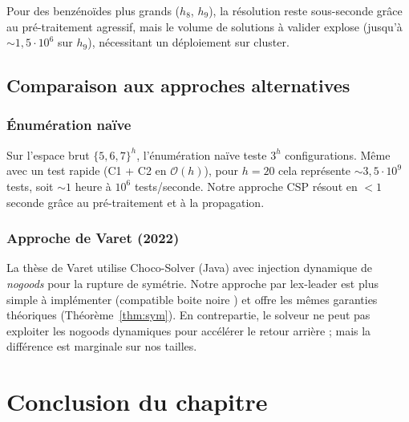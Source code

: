 \documentclass[12pt,a4paper]{article}
\theoremstyle{definition}
\theoremstyle{remark}
\newcommand{\bigO}{\mathcal{O}}
\begin{document}
Pour des benz\'eno\"ides plus grands ($h_8$, $h_9$), la r\'esolution
reste sous-seconde gr\^ace au pr\'e-traitement agressif, mais le
volume de solutions \`a valider explose (jusqu'\`a $\sim 1{,}5 \cdot 10^6$
sur $h_9$), n\'ecessitant un d\'eploiement sur cluster.

\subsection{Comparaison aux approches alternatives}

\subsubsection{\'Enum\'eration na\"ive}

Sur l'espace brut $\{5,6,7\}^h$, l'\'enum\'eration na\"ive teste $3^h$
configurations. M\^eme avec un test rapide (C1 + C2 en $\bigO(h)$), pour
$h = 20$ cela repr\'esente $\sim 3{,}5 \cdot 10^9$ tests, soit
$\sim 1$ heure \`a $10^6$ tests/seconde. Notre approche CSP r\'esout en
$< 1$ seconde gr\^ace au pr\'e-traitement et \`a la propagation.

\subsubsection{Approche de Varet (2022)}

La th\`ese de Varet utilise Choco-Solver (Java) avec injection
dynamique de \emph{nogoods} pour la rupture de sym\'etrie. Notre
approche par lex-leader est plus simple \`a impl\'ementer (compatible
\og boite noire \fg{}) et offre les m\^emes garanties th\'eoriques
(Th\'eor\`eme~\ref{thm:sym}). En contrepartie, le solveur ne peut pas
exploiter les nogoods dynamiques pour acc\'el\'erer le retour arri\`ere ;
mais la diff\'erence est marginale sur nos tailles.

\section{Conclusion du chapitre}
\label{sec:conclusion}
\end{document}
